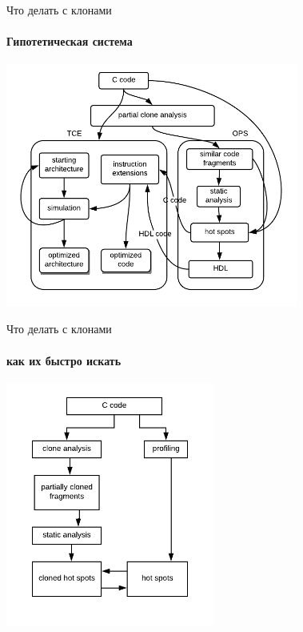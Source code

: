 \documentclass{beamer}              %
\begin{document}
%  

\begin{frame}{Что делать с клонами}
  \framesubtitle{Гипотетическая система}
  \includegraphics[height=8cm]{img/CodesignFlow.png}
\end{frame}

\begin{frame}{Что делать с клонами}
\framesubtitle{как их быстро искать}
  \includegraphics[height=8cm]{img/ClonesFlow.png}
\end{frame}
\end{document}
